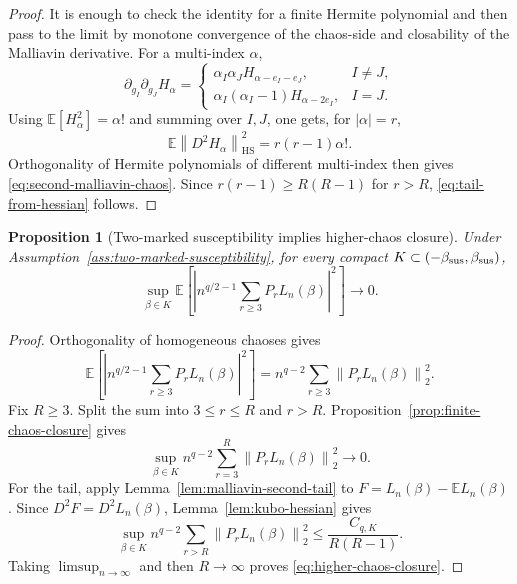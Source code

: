 \documentclass[11pt]{article}
\newtheorem{proposition}[theorem]{Proposition}
\newcommand{\E}{\mathbb{E}}
\newcommand{\norm}[1]{\left\lVert #1\right\rVert}
\newcommand{\HS}{\mathrm{HS}}
\begin{document}
\begin{proof}
  It is enough to check the identity for a finite Hermite polynomial and then
  pass to the limit by monotone convergence of the chaos-side and closability of
  the Malliavin derivative.  For a multi-index $\alpha$,
  \begin{equation}\label{eq:second-derivative-Hermite}
    \partial_{g_I}\partial_{g_J}H_\alpha
    =
    \begin{cases}
      \alpha_I\alpha_J
      H_{\alpha-e_I-e_J}, & I\neq J, \\
      \alpha_I(\alpha_I-1)H_{\alpha-2e_I}, & I=J.
    \end{cases}
  \end{equation}
  Using $\E[H_\alpha^2]=\alpha!$ and summing over $I,J$, one gets, for
  $|\alpha|=r$,
  \begin{equation}\label{eq:Hessian-Halpha}
    \E\norm{D^2H_\alpha}_{\HS}^2
    =
    r(r-1)\alpha!.
  \end{equation}
  Orthogonality of Hermite polynomials of different multi-index then gives
  \eqref{eq:second-malliavin-chaos}.  Since $r(r-1)\geq R(R-1)$ for
  $r>R$, \eqref{eq:tail-from-hessian} follows.
\end{proof}

\begin{proposition}[Two-marked susceptibility implies higher-chaos closure]
  \label{prop:higher-from-two-marked}
  Under Assumption~\ref{ass:two-marked-susceptibility}, for every compact
  $K\subset(-\beta_{\rm sus},\beta_{\rm sus})$,
  \begin{equation}\label{eq:higher-chaos-closure}
    \sup_{\beta\in K}
    \E\left[
      \left|
        n^{q/2-1}\sum_{r\geq3}P_rL_n(\beta)
      \right|^2
    \right]
    \to0.
  \end{equation}
\end{proposition}

\begin{proof}
  Orthogonality of homogeneous chaoses gives
  \begin{equation}\label{eq:higher-orthogonal-sum}
    \E\left[
      \left|
        n^{q/2-1}\sum_{r\geq3}P_rL_n(\beta)
      \right|^2
    \right]
    =
    n^{q-2}\sum_{r\geq3}\norm{P_rL_n(\beta)}_2^2.
  \end{equation}
  Fix $R\geq3$.  Split the sum into $3\leq r\leq R$ and $r>R$.
  Proposition~\ref{prop:finite-chaos-closure} gives
  \begin{equation}\label{eq:finite-part-vanishes}
    \sup_{\beta\in K}
    n^{q-2}
    \sum_{r=3}^R\norm{P_rL_n(\beta)}_2^2
    \to0.
  \end{equation}
  For the tail, apply Lemma~\ref{lem:malliavin-second-tail} to
  $F=L_n(\beta)-\E L_n(\beta)$.  Since $D^2F=D^2L_n(\beta)$,
  Lemma~\ref{lem:kubo-hessian} gives
  \begin{equation}\label{eq:tail-hessian-bound}
    \sup_{\beta\in K}
    n^{q-2}
    \sum_{r>R}\norm{P_rL_n(\beta)}_2^2
    \leq
    \frac{C_{q,K}}{R(R-1)}.
  \end{equation}
  Taking $\limsup_{n\to\infty}$ and then $R\to\infty$ proves
  \eqref{eq:higher-chaos-closure}.
\end{proof}
\end{document}
